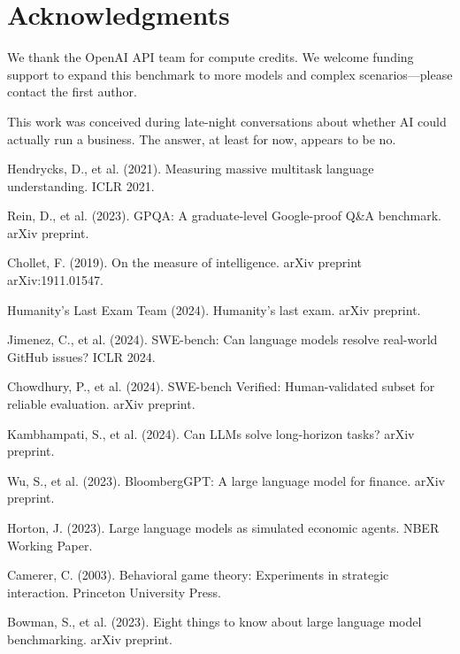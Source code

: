 \documentclass[11pt]{article}
\begin{document}
\section*{Acknowledgments}

We thank the OpenAI API team for compute credits. We welcome funding support to expand this benchmark to more models and complex scenarios—please contact the first author.

This work was conceived during late-night conversations about whether AI could actually run a business. The answer, at least for now, appears to be no.

\begin{thebibliography}{99}

Hendrycks, D., et al. (2021). Measuring massive multitask language understanding. ICLR 2021.

Rein, D., et al. (2023). GPQA: A graduate-level Google-proof Q\&A benchmark. arXiv preprint.

Chollet, F. (2019). On the measure of intelligence. arXiv preprint arXiv:1911.01547.

Humanity's Last Exam Team (2024). Humanity's last exam. arXiv preprint.

Jimenez, C., et al. (2024). SWE-bench: Can language models resolve real-world GitHub issues? ICLR 2024.

Chowdhury, P., et al. (2024). SWE-bench Verified: Human-validated subset for reliable evaluation. arXiv preprint.

Kambhampati, S., et al. (2024). Can LLMs solve long-horizon tasks? arXiv preprint.

Wu, S., et al. (2023). BloombergGPT: A large language model for finance. arXiv preprint.

Horton, J. (2023). Large language models as simulated economic agents. NBER Working Paper.

Camerer, C. (2003). Behavioral game theory: Experiments in strategic interaction. Princeton University Press.

Bowman, S., et al. (2023). Eight things to know about large language model benchmarking. arXiv preprint.

\end{thebibliography}
\end{document}

